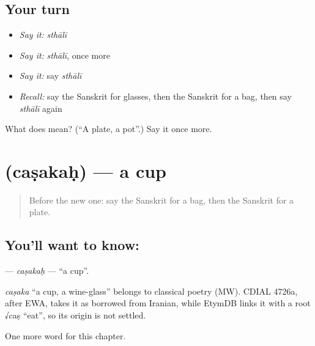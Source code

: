 \subsection*{Your turn}
\begin{itemize}
\raggedright
  \item \emph{Say it:} \emph{sthālī}
  \item \emph{Say it:} \emph{sthālī}, once more
  \item \emph{Say it:} say \emph{sthālī}
  \item \emph{Recall:} say the Sanskrit for glasses, then the Sanskrit for a bag, then say \emph{sthālī} again
\end{itemize}

\begin{tcolorbox}[breakable,colback=teal!4,colframe=teal!35!black,title={Before you move on}]
What does  mean? (\textquotedblleft{}A plate, a pot\textquotedblright{}.) Say it once more.
\end{tcolorbox}
\section[\texorpdfstring{\sk{चषकः} (caṣakaḥ)}{चषकः (caṣakaḥ)}]{ (caṣakaḥ) — a cup}

\label{lesson:SA-C102-casakah}



\begin{quote}
Before the new one: say the Sanskrit for a bag, then the Sanskrit for a plate.
\end{quote}

\subsection*{You'll want to know: }
\textbf{} — \emph{caṣakaḥ} — \textquotedblleft{}a cup\textquotedblright{}.

\begin{cousinweb}
\emph{caṣaka} \textquotedblleft{}a cup, a wine-glass\textquotedblright{} belongs to classical poetry (MW). CDIAL 4726a, after EWA, takes it as borrowed from Iranian, while EtymDB links it with a root √caṣ \textquotedblleft{}eat\textquotedblright{}, so its origin is not settled.
\end{cousinweb}

\begin{grammarlens}[title={What you've built}]
One more word for this chapter.
\end{grammarlens}

